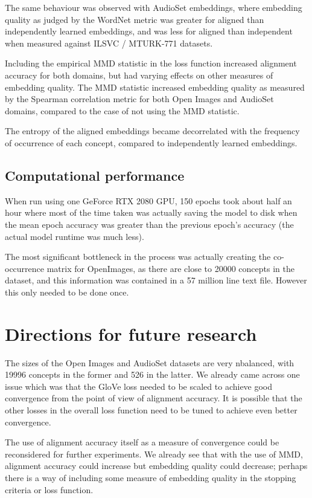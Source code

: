 The same behaviour was observed with AudioSet embeddings, where embedding quality as judged by the WordNet metric was greater for aligned than independently learned embeddings, and was less for aligned than independent when measured against ILSVC / MTURK-771 datasets. 


Including the empirical MMD statistic in the loss function increased alignment accuracy for both domains, but had varying effects on other measures of embedding quality. The MMD statistic increased embedding quality as measured by the Spearman correlation metric for both Open Images and AudioSet domains, compared to the case of not using the MMD statistic. 

The entropy of the aligned embeddings became decorrelated with the frequency of occurrence of each concept, compared to independently learned embeddings. 


\subsection{Computational performance}

When run using one GeForce RTX 2080 GPU, 150 epochs took about half an hour where most of the time taken was actually saving the model to disk when the mean epoch accuracy was greater than the previous epoch's accuracy (the actual model runtime was much less). 

The most significant bottleneck in the process was actually creating the co-occurrence matrix for OpenImages, as there are close to 20000 concepts in the dataset, and this information was contained in a 57 million line text file. However this only needed to be done once. 

\section{Directions for future research}

The sizes of the Open Images and AudioSet datasets are very nbalanced, with 19996 concepts in the former and 526 in the latter. We already came across one issue which was that the GloVe loss needed to be scaled to achieve good convergence from the point of view of alignment accuracy. It is possible that the other losses in the overall loss function need to be tuned to achieve even better convergence. 

The use of alignment accuracy itself as a measure of convergence could be reconsidered for further experiments. We already see that with the use of MMD, alignment accuracy could increase but embedding quality could decrease; perhaps there is a way of including some measure of embedding quality in the stopping criteria or loss function. 


